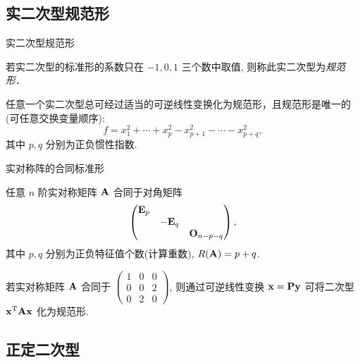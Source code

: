 \subsection{实二次型规范形}



\begin{frame}{实二次型规范形}
	\onslide<+->
	\begin{definition}
		若实二次型的标准形的系数只在 $−1, 0, 1$ 三个数中取值, 则称此实二次型为\emph{规范形}．
	\end{definition}
	\onslide<+->
	\begin{theorem}
		任意一个实二次型总可经过适当的可逆线性变换化为规范形，且规范形是唯一的(可任意交换变量顺序):
		\[f=x_1^2+\cdots+x_p^2-x_{p+1}^2-\cdots-x_{p+q}^2,\]
		其中 $p,q$ 分别为正负惯性指数.
	\end{theorem}
\end{frame}


\begin{frame}{实对称阵的合同标准形}
	\onslide<+->
	\begin{corollary}
		任意 $n$ 阶实对称矩阵 ${\mathbf{A}}$ 合同于对角矩阵
		\[\begin{pmatrix}
			{\mathbf{E}}_p&&\\
			&-{\mathbf{E}}_q&\\
			&&{\mathbf{O}}_{n-p-q}
		\end{pmatrix},\]
		其中 $p,q$ 分别为正负特征值个数(计算重数), $R({\mathbf{A}})=p+q$.
	\end{corollary}
	\onslide<+->
	\begin{example}
		若实对称矩阵 ${\mathbf{A}}$ 合同于 $\begin{pmatrix}
			1&0&0\\0&0&2\\0&2&0
		\end{pmatrix}$, 则通过可逆线性变换 ${\mathbf{x}}={\mathbf{P}}{\mathbf{y}}$ 可将二次型 ${\mathbf{x}}^{\mathrm{T}}{\mathbf{A}}{\mathbf{x}}$ 化为规范形.
	\end{example}
\end{frame}

\subsection{正定二次型}

